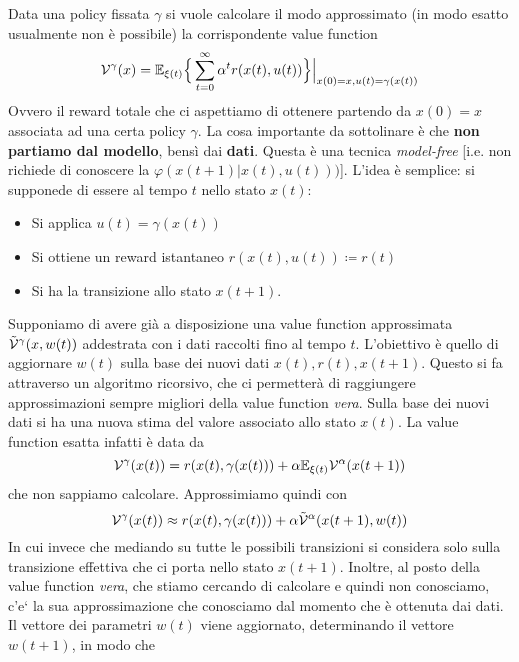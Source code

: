 Data una policy fissata $\gamma$ si vuole calcolare il modo approssimato (in modo esatto usualmente non \`e possibile) la corrispondente value function
\begin{equation}
\mathcal{V}^\gamma(x) = \mathbb{E}_{\xi(t)} \Big \{ \sum_{t=0}^\infty \alpha^t r(x(t),u(t)) \Big \} \Big |_{x(0)=x, u(t) = \gamma(x(t))}
\end{equation} Ovvero il reward totale che ci aspettiamo di ottenere partendo da $x(0)=x$ associata ad una certa policy $\gamma$. La cosa importante da sottolinare \`e che \textbf{non partiamo dal modello}, bens\`i dai \textbf{dati}. Questa \`e una tecnica \textit{model-free} [i.e. non richiede di conoscere la $\varphi(x(t+1)|x(t),u(t)))$].
L'idea \`e semplice: si supponede di essere al tempo $t$ nello stato $x(t)$:
\begin{itemize}
\item Si applica $u(t) = \gamma(x(t))$
\item Si ottiene un reward istantaneo $r(x(t),u(t)) \coloneqq r(t)$
\item Si ha la transizione allo stato $x(t+1)$.
\end{itemize}
Supponiamo di avere gi\`a a disposizione una value function approssimata $\tilde{\mathcal{V}}^\gamma (x, w(t))$ addestrata con i dati raccolti fino al tempo $t$. L'obiettivo \`e quello di aggiornare $w(t)$ sulla base dei nuovi dati $x(t), r(t), x(t+1)$. Questo si fa attraverso un algoritmo ricorsivo, che ci permetter\`a di raggiungere approssimazioni sempre migliori della value function \textit{vera}. 
Sulla base dei nuovi dati si ha una nuova stima del valore associato allo stato $x(t)$. La value function esatta infatti \`e data da
\begin{equation}
\mathcal{V}^\gamma(x(t)) = r(x(t), \gamma(x(t))) + \alpha \mathbb{E}_{\xi(t)} \mathcal{V}^\alpha(x(t+1))
\end{equation} che non sappiamo calcolare. Approssimiamo quindi con
\begin{equation}
\mathcal{V}^\gamma (x(t)) \approx r(x(t), \gamma(x(t))) + \alpha \tilde{\mathcal{V}}^\alpha(x(t+1), w(t))
\end{equation} In cui invece che mediando su tutte le possibili transizioni si considera solo sulla transizione effettiva che ci porta nello stato $x(t+1)$. Inoltre, al posto della value function \textit{vera}, che stiamo cercando di calcolare e quindi non conosciamo, c'e` la sua approssimazione che conosciamo dal momento che \`e ottenuta dai dati.
Il vettore dei parametri $w(t)$ viene aggiornato, determinando il vettore $w(t+1)$, in modo che 
